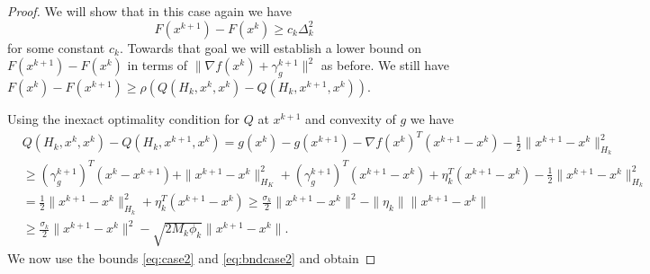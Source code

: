 \documentclass[11pt]{article}
\numberwithin{equation}{section}
\begin{document}
\begin{proof}
	 
	 We will  show that in this case again we have 
	 \begin{equation}\label{eq:mainbnd}
	 F(x^{k+1})-F(x^k)\geq c_k \Delta_k^2
	 \end{equation}
	  for some constant $c_k$.  
	Towards that goal  we will establish a lower bound on $F(x^{k+1})-F(x^k)$ in terms of $\|\nabla f(x^k)+\gamma_g^{k+1}\|^2$ as before.
	 We still have $F(x^{k})-F(x^{k+1})\geq \rho (Q(H_k, x^{k}, x^k)-Q(H_k,x^{k+1}, x^k))$. 
	  

	 Using the inexact optimality condition for $Q$ at $x^{k+1}$ and convexity of $g$ we have
	        \begin{align}
	        &Q(H_k,x^k,x^k) - Q(H_k,x^{k+1}, x^k)
	        = g(x^k) - g(x^{k+1}) -  \nabla f(x^k)^T( x^{k+1}-x^k)  - \frac{1}{2}\|x^{k+1}-x^k\|^2_{H_k} \nonumber \\
	        \nonumber&\geq ( \gamma_g^{k+1})^T( x^{k}-x^{k+1} ) + \|x^{k+1}-x^k\|_{H_K}^2 +  (\gamma_g^{k+1})^T( x^{k+1}-x^k )+ \eta_k^T( x^{k+1}-x^k ) - \frac{1}{2}\|x^{k+1}-x^k\|^2_{H_k} \\
	          \label{eq:lowerbndinexact}
	&= \frac{1}{2}\|x^{k+1}-x^k\|^2_{H_k} + \eta_k^T( x^{k+1}-x^k )\geq \frac{\sigma_k}{2}\|x^{k+1}-x^k\|^2-
	        \|\eta_k\|\|x^{k+1}-x^k\|  \\
	        \nonumber &\geq \frac{\sigma_k}{2}\|x^{k+1}-x^k\|^2-\sqrt{2M_k\phi_k}\|x^{k+1}-x^k\|.
	         \end{align}
	      We now use the bounds \eqref{eq:case2} and \eqref{eq:bndcase2} and obtain
	      

\end{proof}
\end{document}
